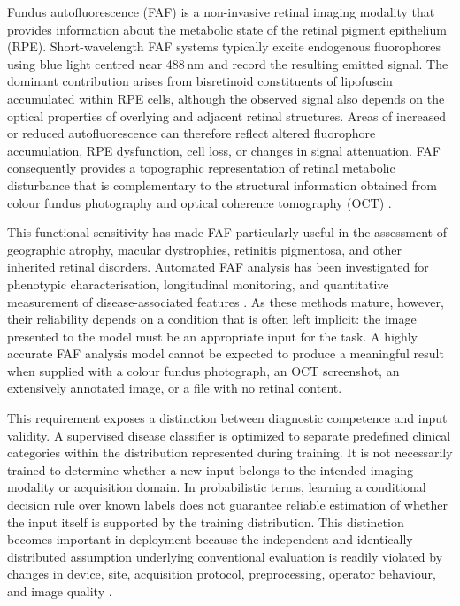 \documentclass[fleqn,12pt]{olplainarticle}
\begin{document}
Fundus autofluorescence (FAF) is a non-invasive retinal imaging modality that provides information about the metabolic state of the retinal pigment epithelium (RPE). Short-wavelength FAF systems typically excite endogenous fluorophores using blue light centred near 488\,nm and record the resulting emitted signal. The dominant contribution arises from bisretinoid constituents of lipofuscin accumulated within RPE cells, although the observed signal also depends on the optical properties of overlying and adjacent retinal structures. Areas of increased or reduced autofluorescence can therefore reflect altered fluorophore accumulation, RPE dysfunction, cell loss, or changes in signal attenuation. FAF consequently provides a topographic representation of retinal metabolic disturbance that is complementary to the structural information obtained from colour fundus photography and optical coherence tomography (OCT) \cite{yung2016clinical,schmitzvalckenberg2021fundus}.

This functional sensitivity has made FAF particularly useful in the assessment of geographic atrophy, macular dystrophies, retinitis pigmentosa, and other inherited retinal disorders. Automated FAF analysis has been investigated for phenotypic characterisation, longitudinal monitoring, and quantitative measurement of disease-associated features \cite{woof2025quantification}. As these methods mature, however, their reliability depends on a condition that is often left implicit: the image presented to the model must be an appropriate input for the task. A highly accurate FAF analysis model cannot be expected to produce a meaningful result when supplied with a colour fundus photograph, an OCT screenshot, an extensively annotated image, or a file with no retinal content.

This requirement exposes a distinction between diagnostic competence and input validity. A supervised disease classifier is optimized to separate predefined clinical categories within the distribution represented during training. It is not necessarily trained to determine whether a new input belongs to the intended imaging modality or acquisition domain. In probabilistic terms, learning a conditional decision rule over known labels does not guarantee reliable estimation of whether the input itself is supported by the training distribution. This distinction becomes important in deployment because the independent and identically distributed assumption underlying conventional evaluation is readily violated by changes in device, site, acquisition protocol, preprocessing, operator behaviour, and image quality \cite{amodei2016concrete,kelly2019clinicalimpact,varoquaux2022medicalimaging}.
\end{document}
